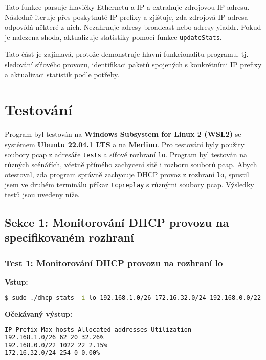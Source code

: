 \documentclass[a4paper, 11pt]{article}
\begin{document}
    Tato funkce parsuje hlavičky Ethernetu a IP a extrahuje zdrojovou IP adresu. Následně iteruje přes poskytnuté IP prefixy a zjišťuje, zda zdrojová IP adresa odpovídá některé z nich. Nezahrnuje adresy broadcast nebo adresy yiaddr. Pokud je nalezena shoda, aktualizuje statistiky pomocí funkce \texttt{updateStats}.

    Tato část je zajímavá, protože demonstruje hlavní funkcionalitu programu, tj. sledování síťového provozu, identifikaci paketů spojených s konkrétními IP prefixy a aktualizaci statistik podle potřeby.

    \section{Testování}

    Program byl testován na \textbf{Windows Subsystem for Linux 2 (WSL2)} se systémem \textbf{Ubuntu 22.04.1 LTS} a na \textbf{Merlinu}. Pro testování byly použity soubory pcap z adresáře \texttt{tests} a síťové rozhraní \texttt{lo}. Program byl testován na různých scénářích, včetně přímého zachycení sítě i rozboru souborů pcap. Abych otestoval, zda program správně zachycuje DHCP provoz z rozhraní \texttt{lo}, spustil jsem ve druhém terminálu příkaz \texttt{tcpreplay} s různými soubory pcap. Výsledky testů jsou uvedeny níže.

    \subsection{Sekce 1: Monitorování DHCP provozu na specifikovaném rozhraní}

    \subsubsection{Test 1: Monitorování DHCP provozu na rozhraní lo}

    \textbf{Vstup:}

    \begin{lstlisting}[language=bash]
$ sudo ./dhcp-stats -i lo 192.168.1.0/26 172.16.32.0/24 192.168.0.0/22
    \end{lstlisting}

    \textbf{Očekávaný výstup:}

    \begin{lstlisting}[language=bash]
IP-Prefix Max-hosts Allocated addresses Utilization
192.168.1.0/26 62 20 32.26%
192.168.0.0/22 1022 22 2.15%
172.16.32.0/24 254 0 0.00%
    \end{lstlisting}
\end{document}
